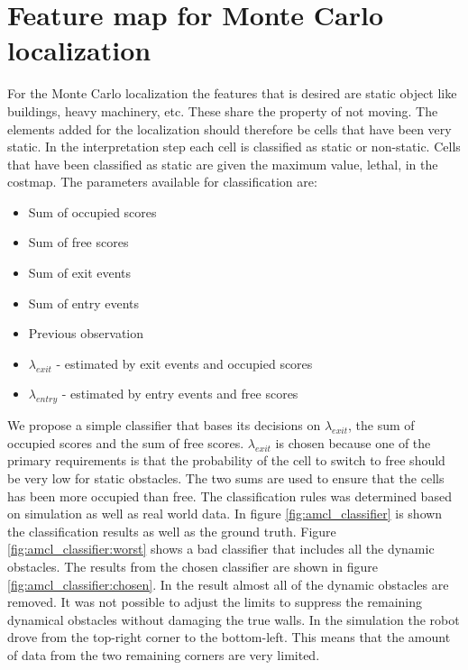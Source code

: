 \section{Feature map for Monte Carlo localization}
For the Monte Carlo localization the features that is desired are static object like buildings, heavy machinery, etc. These share the property of not moving. The elements added for the localization should therefore be cells that have been very static. In the interpretation step each cell is classified as static or non-static. Cells that have been classified as static are given the maximum value, lethal, in the costmap. 
The parameters available for classification are:
\begin{itemize} 
\item Sum of occupied scores
\item Sum of free scores
\item Sum of exit events
\item Sum of entry events
\item Previous observation
\item \(\lambda_{exit}\) - estimated by exit events and occupied scores
\item \(\lambda_{entry}\) - estimated by entry events and free scores
\end{itemize}

We propose a simple classifier that bases its decisions on \(\lambda_{exit}\), the sum of occupied scores and the sum of free scores.  \(\lambda_{exit}\) is chosen because one of the primary requirements is that the probability of the cell to switch to free should be very low for static obstacles. The two sums are used to ensure that the cells has been more occupied than free. 
The classification rules was determined based on simulation as well as real world data. In figure \ref{fig:amcl_classifier} is shown the classification results as well as the ground truth. Figure \ref{fig:amcl_classifier:worst} shows a bad classifier that includes all the dynamic obstacles. The results from the chosen classifier are shown in figure \ref{fig:amcl_classifier:chosen}. In the result almost all of the dynamic obstacles are removed. It was not possible to adjust the limits to suppress the remaining dynamical obstacles without damaging the true walls. In the simulation the robot drove from the top-right corner to the bottom-left. This means that the amount of data from the two remaining corners are very limited. 

